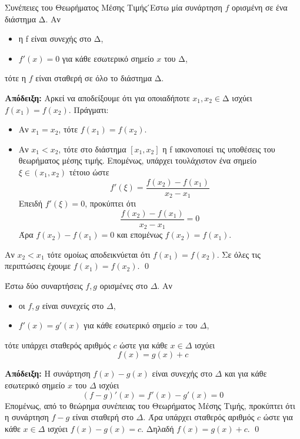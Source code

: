 \documentclass[a4paper, 12pt]{article}
\renewenvironment{proof}[1][\textbf{Απόδειξη}]{%
  \par\noindent\textbf{#1:} \rmfamily}{\qed\par}
\begin{document}
\begin{theorem}{Συνέπειες του Θεωρήματος Μέσης Τιμής}
  ́Εστω μία συνάρτηση $f$ ορισμένη σε ένα διάστημα $∆$. Αν
  \begin{itemize}
    \item η f είναι συνεχής στο $∆$,
    \item $f'(x)=0$ για κάθε εσωτερικό σημείο $x$ του $∆$,
  \end{itemize}
  τότε η $f$ είναι σταθερή σε όλο το διάστημα $∆$.
\end{theorem}
\begin{proof}
  Αρκεί να αποδείξουμε ότι για οποιαδήποτε $x_1,x_2\in ∆$ ισχύει $f(x_1)=f(x_2)$. Πράγματι:
  \begin{itemize}
    \item Αν $x_1=x_2$, τότε $f(x_1)=f(x_2)$.
    \item Αν $x_1< x_2$, τότε στο διάστημα $[x_1,x_2]$ η f ιακονοποιεί τις υποθέσεις του θεωρήματος μέσης τιμής. Επομένως, υπάρχει τουλάχιστον ένα σημείο $ξ\in (x_1,x_2)$ τέτοιο ώστε
          $$f'(ξ)=\frac{f(x_2)-f(x_1)}{x_2-x_1}$$
          Επειδή $f'(ξ)=0$, προκύπτει ότι
          $$\frac{f(x_2)-f(x_1)}{x_2-x_1}=0$$
          Άρα $f(x_2)-f(x_1)=0$ και επομένως $f(x_2)=f(x_1)$.
  \end{itemize}
  Αν $x_2<x_1$ τότε ομοίως αποδεικνύεται ότι $f(x_1)=f(x_2)$. Σε όλες τις περιπτώσεις έχουμε $f(x_1)=f(x_2)$.
\end{proof}

\begin{theorem}{}
  Έστω δύο συναρτήσεις $f,g$ ορισμένες στο $Δ$. Αν
  \begin{itemize}
    \item οι $f,g$ είναι συνεχείς στο $Δ$,
    \item $f'(x)=g'(x)$ για κάθε εσωτερικό σημείο $x$ του $Δ$,
  \end{itemize}
  τότε υπάρχει σταθερός αριθμός $c$ ώστε για κάθε $x\in Δ$ ισχύει
  $$f(x)=g(x)+c$$
\end{theorem}
\begin{proof}
  Η συνάρτηση $f(x)-g(x)$ είναι συνεχής στο $Δ$ και για κάθε εσωτερικό σημείο $x$ του $Δ$ ισχύει
  $$\left( f-g \right)'(x)=f'(x)-g'(x)=0$$
  Επομένως, από το θεώρημα συνέπειας του Θεωρήματος Μέσης Τιμής, προκύπτει ότι η συνάρτηση $f-g$ είναι σταθερή στο $Δ$. Άρα υπάρχει σταθερός αριθμός $c$ ώστε για κάθε $x\in Δ$ ισχύει $f(x)-g(x)=c$. Δηλαδή $f(x)=g(x)+c$.
\end{proof}
\end{document}
